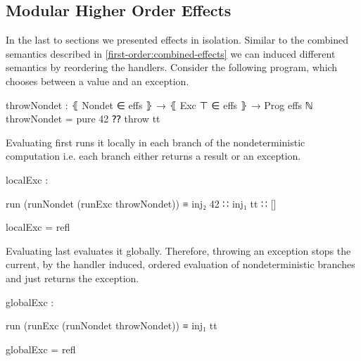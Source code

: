 \subsection{Modular Higher Order Effects}

In the last to sections we presented effects in isolation.
Similar to the combined semantics described in
\ref{first-order:combined-effects} we can induced different semantics by
reordering the handlers.
Consider the following program, which chooses between a
 value and an exception.

\begin{code}
throwNondet : ⦃ Nondet ∈ effs ⦄ → ⦃ Exc ⊤ ∈ effs ⦄ → Prog effs ℕ
throwNondet = pure 42 ⁇ throw tt
\end{code}
Evaluating  first runs it locally in each branch of the
nondeterministic computation i.e. each branch either returns a result or an
exception. 
\begin{center}
\begin{code}
localExc : 
\end{code}
\begin{code}[inline]
 run (runNondet (runExc throwNondet)) ≡ inj₂ 42 ∷ inj₁ tt ∷ []
\end{code}
\begin{code}
localExc = refl
\end{code}
\end{center}
Evaluating  last evaluates it globally.
Therefore, throwing an exception stops the current, by the 
handler induced, ordered evaluation of nondeterministic branches and just
returns the exception.
\begin{center}
\begin{code}
globalExc : 
\end{code}
\begin{code}[inline]
 run (runExc (runNondet throwNondet)) ≡ inj₁ tt
\end{code}
\begin{code}
globalExc = refl
\end{code}
\end{center}